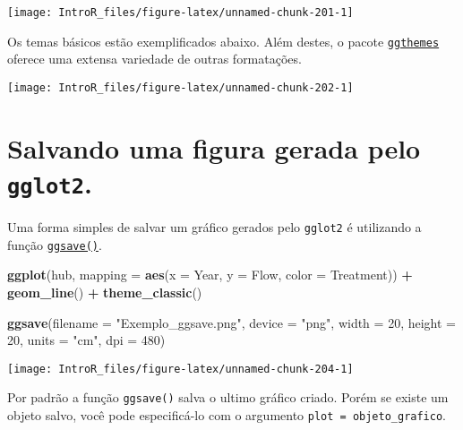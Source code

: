 \documentclass[
]{book}
\newenvironment{Shaded}{\begin{snugshade}}{\end{snugshade}}
\newcommand{\DataTypeTok}[1]{\textcolor[rgb]{0.13,0.29,0.53}{#1}}
\newcommand{\DecValTok}[1]{\textcolor[rgb]{0.00,0.00,0.81}{#1}}
\newcommand{\KeywordTok}[1]{\textcolor[rgb]{0.13,0.29,0.53}{\textbf{#1}}}
\newcommand{\NormalTok}[1]{#1}
\newcommand{\OperatorTok}[1]{\textcolor[rgb]{0.81,0.36,0.00}{\textbf{#1}}}
\newcommand{\StringTok}[1]{\textcolor[rgb]{0.31,0.60,0.02}{#1}}
\begin{document}
\begin{center}\texttt{[image: IntroR\_files/figure-latex/unnamed-chunk-201-1]} \end{center}

Os temas básicos estão exemplificados abaixo. Além destes, o pacote \href{https://cran.r-project.org/web/packages/ggthemes/index.html}{\texttt{ggthemes}} oferece uma extensa variedade de outras formatações.

\begin{center}\texttt{[image: IntroR\_files/figure-latex/unnamed-chunk-202-1]} \end{center}

\hypertarget{salvando-uma-figura-gerada-pelo-gglot2.}{%
\section{\texorpdfstring{Salvando uma figura gerada pelo \texttt{gglot2}.}{Salvando uma figura gerada pelo gglot2.}}\label{salvando-uma-figura-gerada-pelo-gglot2.}}

Uma forma simples de salvar um gráfico gerados pelo \texttt{gglot2} é utilizando a função \href{https://ggplot2.tidyverse.org/reference/ggsave.html}{\texttt{ggsave()}}.

\begin{Shaded}
\begin{Highlighting}[]
\KeywordTok{ggplot}\NormalTok{(hub, }\DataTypeTok{mapping =} \KeywordTok{aes}\NormalTok{(}\DataTypeTok{x =}\NormalTok{ Year, }\DataTypeTok{y =}\NormalTok{ Flow, }\DataTypeTok{color =}\NormalTok{ Treatment)) }\OperatorTok{+}
\StringTok{  }\KeywordTok{geom_line}\NormalTok{() }\OperatorTok{+}
\StringTok{  }\KeywordTok{theme_classic}\NormalTok{()}

\KeywordTok{ggsave}\NormalTok{(}\DataTypeTok{filename =} \StringTok{"Exemplo_ggsave.png"}\NormalTok{, }
       \DataTypeTok{device =} \StringTok{"png"}\NormalTok{,}
       \DataTypeTok{width =} \DecValTok{20}\NormalTok{, }
       \DataTypeTok{height =} \DecValTok{20}\NormalTok{,}
       \DataTypeTok{units =} \StringTok{"cm"}\NormalTok{,}
       \DataTypeTok{dpi =} \DecValTok{480}\NormalTok{)  }
\end{Highlighting}
\end{Shaded}

\begin{center}\texttt{[image: IntroR\_files/figure-latex/unnamed-chunk-204-1]} \end{center}

Por padrão a função \texttt{ggsave()} salva o ultimo gráfico criado. Porém se existe um objeto salvo, você pode especificá-lo com o argumento \texttt{plot\ =\ objeto\_grafico}.

  
\end{document}

